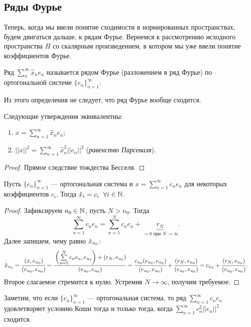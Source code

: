 \subsection{Ряды Фурье}
Теперь, когда мы ввели понятие сходимости в нормированных пространствах, будем двигаться дальше, к рядам Фурье. Вернемся к рассмотрению исходного пространства $H$ со скалярным произведением, в котором мы уже ввели понятие коэффициентов Фурье.
\begin{Def}
    Ряд $\sum\limits_{n}^{\infty} \hat{x}_ne_n$ называется рядом Фурье (разложением в ряд Фурье) по ортогональной системе $\{e_n\}_{n=1}^{\infty}$.
\end{Def}
Из этого определения не следует, что ряд Фурье вообще сходится.
\begin{Statement}
    Следующие утверждения эквивалентны:
    \begin{enumerate}
        \item $x = \sum\limits_{n=1}^{\infty} \hat{x}_ne_n$;
        \item $||x||^2 = \sum\limits_{n=1}^{\infty} \hat{x}^2_n ||e_n||^2$ (\textit{равенство Парсеваля}).
    \end{enumerate}
\end{Statement}
\begin{proof}
    Прямое следствие тождества Бесселя.
\end{proof}
\begin{Statement}
    Пусть $\{e_n\}_{n=1}^{\infty}$ --- ортогональная система и $x = \sum\limits_{n=1}^{\infty}c_n e_n$ для некоторых коэффициентов $c_i$. Тогда $\hat{x}_i = c_i\;\ \forall i \in \mathbb{N}$.
\end{Statement}
\begin{proof}
    Зафиксируем $n_0\in \mathbb{N}$, пусть $N>n_0$. Тогда
    $$
        \sum\limits_{n=1}^{\infty} c_ne_n = \sum \limits_{n=1}^{N}c_n e_n + \underbrace{r_N}_{\to 0 \text{ при } N\to \infty}.
    $$
    Далее запишем, чему равно $\hat{x}_{n_0}$:
    $$
        \hat{x}_{n_0} = \cfrac{(x,e_{n_0})}{(e_{n_0}, e_{n_0})} = \cfrac{\left(\sum\limits_{n=1}^{N} c_ne_n, e_{n_0}\right) + \left(r_N, e_{n_0}\right)}{(e_{n_0}, e_{n_0})} = \cfrac{c_{n_0}(e_{n_0}, e_{n_0})}{(e_{n_0}, e_{n_0})} + \cfrac{(r_N, e_{n_0})}{(e_{n_0}, e_{n_0})} = c_{n_0} + \cfrac{(r_N, e_{n_0})}{(e_{n_0}, e_{n_0})}.
    $$
    Второе слагаемое стремится к нулю. Устремив $N \to \infty$, получим требуемое.
\end{proof}
Заметим, что если $\{e_n\}_{n=1}^{\infty}$ --- ортогональная система, то ряд $\sum\limits_{n=1}^{\infty} c_n e_n$ удовлетворяет условию Коши тогда и только тогда, когда $\sum\limits_{n=1}^{\infty}c_n^2||e_n||^2$ сходится.
